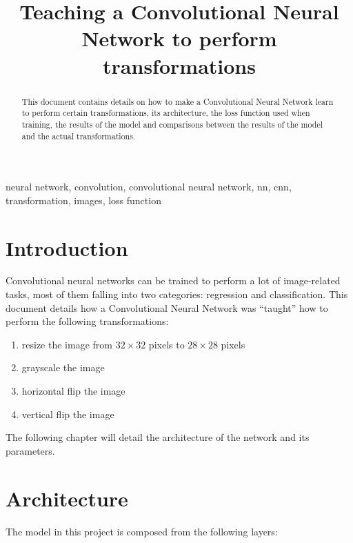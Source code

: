\documentclass[conference]{IEEEtran}
\begin{document}
\title{Teaching a Convolutional Neural Network to perform transformations}

\author{
}

\maketitle


\begin{abstract}
This document contains details on how to make a Convolutional Neural Network learn to perform certain transformations, its
architecture, the loss function used when training, the results of the model and comparisons between the results of the model
and the actual transformations.
\end{abstract}

\begin{IEEEkeywords}
neural network, convolution, convolutional neural network, nn, cnn, transformation, images, loss function
\end{IEEEkeywords}


\section{Introduction}
Convolutional neural networks can be trained to perform a lot of image-related tasks, most of them falling into two categories:
regression and classification. This document details how a Convolutional Neural Network was ``taught'' how to perform
the following transformations:

\begin{enumerate}
    \item resize the image from $32 \times 32$ pixels to $28 \times 28$ pixels
    \item grayscale the image
    \item horizontal flip the image
    \item vertical flip the image
\end{enumerate}

The following chapter will detail the architecture of the network and its parameters.

\section{Architecture}
The model in this project is composed from the following layers:
\end{document}
